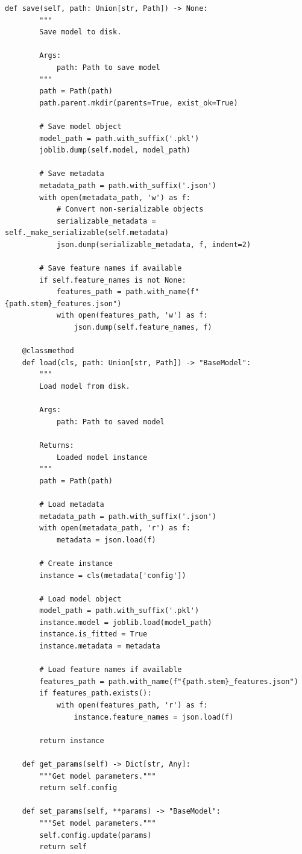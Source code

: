 \begin{lstlisting}[style=python, caption=Abstract base class for ML models]
    def save(self, path: Union[str, Path]) -> None:
        """
        Save model to disk.

        Args:
            path: Path to save model
        """
        path = Path(path)
        path.parent.mkdir(parents=True, exist_ok=True)

        # Save model object
        model_path = path.with_suffix('.pkl')
        joblib.dump(self.model, model_path)

        # Save metadata
        metadata_path = path.with_suffix('.json')
        with open(metadata_path, 'w') as f:
            # Convert non-serializable objects
            serializable_metadata = self._make_serializable(self.metadata)
            json.dump(serializable_metadata, f, indent=2)

        # Save feature names if available
        if self.feature_names is not None:
            features_path = path.with_name(f"{path.stem}_features.json")
            with open(features_path, 'w') as f:
                json.dump(self.feature_names, f)

    @classmethod
    def load(cls, path: Union[str, Path]) -> "BaseModel":
        """
        Load model from disk.

        Args:
            path: Path to saved model

        Returns:
            Loaded model instance
        """
        path = Path(path)

        # Load metadata
        metadata_path = path.with_suffix('.json')
        with open(metadata_path, 'r') as f:
            metadata = json.load(f)

        # Create instance
        instance = cls(metadata['config'])

        # Load model object
        model_path = path.with_suffix('.pkl')
        instance.model = joblib.load(model_path)
        instance.is_fitted = True
        instance.metadata = metadata

        # Load feature names if available
        features_path = path.with_name(f"{path.stem}_features.json")
        if features_path.exists():
            with open(features_path, 'r') as f:
                instance.feature_names = json.load(f)

        return instance

    def get_params(self) -> Dict[str, Any]:
        """Get model parameters."""
        return self.config

    def set_params(self, **params) -> "BaseModel":
        """Set model parameters."""
        self.config.update(params)
        return self


\end{lstlisting}

